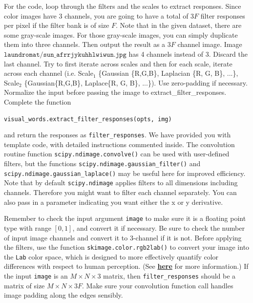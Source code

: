 \documentclass[11pt]{article}
\numberwithin{equation}{section} %
\numberwithin{figure}{section} %
\numberwithin{table}{section} %
\begin{document}
\par {} 
For the code, loop through the filters and the scales to extract responses. Since color images have $3$ channels, you are going to have a total of $3F$ filter responses per pixel if the filter bank is of size $F$. Note that in the given dataset, there are some gray-scale images. For those gray-scale images, you can simply duplicate them into three channels. Then output the result as a $3F$ channel image. Image $\texttt{laundromat/sun\_afrrjykuhhlwiwun.jpg}$ has 4 channels instead of 3. Discard the last channel. Try to first iterate across scales and then for each scale, iterate across each channel (i.e. Scale$_1$ \{Gaussian \{R,G,B\}, Laplacian \{R, G, B\}, ...\}, Scale$_2$ \{Gaussian\{R,G,B\}, Laplace\{R, G, B\}, ...\}). Use zero-padding if necessary. Normalize the input before passing the image to extract\_filter\_responses. Complete the function 
\begin{center}
    {\tt visual\_words.extract\_filter\_responses(opts, img)}
\end{center}
and return the responses as {\tt filter\_responses}.
We have provided you with template code, with detailed instructions commented inside. The convolution routine function {\tt scipy.ndimage.convolve()} can be used with user-defined filters, but the functions {\tt scipy.ndimage.gaussian\_filter()} and {\tt scipy.ndimage.gaussian\_laplace()} may be useful here for improved efficiency. Note that by default {\tt scipy.ndimage} applies filters to all dimensions including channels. Therefore you might want to filter each channel separately. You can also pass in a parameter indicating you want either the x or y derivative.

Remember to check the input argument {\tt image} to make sure it is a floating point type with range $[0, 1]$, and convert it if necessary. Be sure to check the number of input image channels and convert it to 3-channel if it is not. Before applying the filters, use the function {\tt skimage.color.rgb2lab()} to convert your image into the {\tt Lab} color space, which is designed to more effectively quantify color differences with respect to human perception. (See {\bf \href{https://en.wikipedia.org/wiki/CIELAB_color_space}{here}} for more information.) If the input {\tt image} is an $M \times N \times 3$ matrix, then {\tt filter\_responses} should be a matrix of size $M \times N \times 3F$. Make sure your convolution function call handles image padding along the edges sensibly.
\end{document}
